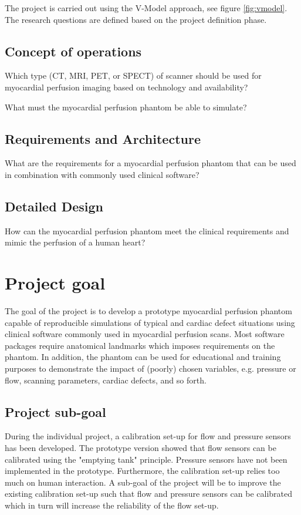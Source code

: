 The project is carried out using the V-Model \citep{rook1986controlling,osborne2005clarus} approach, see figure \ref{fig:vmodel}. The research questions are defined based on the project definition phase.

\subsection{Concept of operations}
Which type (CT, MRI, PET, or SPECT) of scanner should be used for myocardial perfusion imaging based on technology and availability?

What must the myocardial perfusion phantom be able to simulate?

\subsection{Requirements and Architecture}
What are the requirements for a myocardial perfusion phantom that can be used in combination with commonly used clinical software?

\subsection{Detailed Design}
How can the myocardial perfusion phantom meet the clinical requirements and mimic the perfusion of a human heart?

\section{Project goal}
The goal of the project is to develop a prototype myocardial perfusion phantom capable of reproducible simulations of typical and cardiac defect situations using clinical software commonly used in myocardial perfusion scans. Most software packages require anatomical landmarks which imposes requirements on the phantom. In addition, the phantom can be used for educational and training purposes to demonstrate the impact of (poorly) chosen variables, e.g. pressure or flow, scanning parameters, cardiac defects, and so forth.

\subsection*{Project sub-goal}
During the individual project, a calibration set-up for flow and pressure sensors has been developed. The prototype version showed that flow sensors can be calibrated using the "emptying tank" principle. Pressure sensors have not been implemented in the prototype. Furthermore, the calibration set-up relies too much on human interaction. A sub-goal of the project will be to improve the existing calibration set-up such that flow and pressure sensors can be calibrated which in turn will increase the reliability of the flow set-up.

